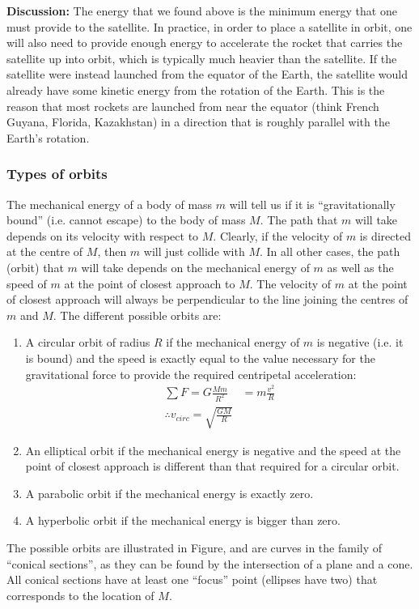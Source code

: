 \begin{example}
\textbf{Discussion:} The energy that we found above is the minimum energy that one must provide to the satellite. In practice, in order to place a satellite in orbit, one will also need to provide enough energy to accelerate the rocket that carries the satellite up into orbit, which is typically much heavier than the satellite. If the satellite were instead launched from the equator of the Earth, the satellite would already have some kinetic energy from the rotation of the Earth. This is the reason that most rockets are launched from near the equator (think French Guyana, Florida, Kazakhstan) in a direction that is roughly parallel with the Earth's rotation.
\end{example}

\subsubsection{Types of orbits}
The mechanical energy of a body of mass $m$ will tell us if it is ``gravitationally bound'' (i.e. cannot escape) to the body of mass $M$. The path that $m$ will take depends on its velocity with respect to $M$. Clearly, if the velocity of $m$ is directed at the centre of $M$, then $m$ will just collide with $M$. In all other cases, the path (orbit) that $m$ will take depends on the mechanical energy of $m$ as well as the speed of $m$ at the point of closest approach to $M$. The velocity of $m$ at the point of closest approach will always be perpendicular to the line joining the centres of $m$ and $M$. The different possible orbits are:
\begin{enumerate}
\item A circular orbit of radius $R$ if the mechanical energy of $m$ is negative (i.e. it is bound) and the speed is exactly equal to the value necessary for the gravitational force to provide the required centripetal acceleration:
\begin{align*}
\sum F = G\frac{Mm}{R^2} &= m\frac{v^2}{R}\\
\therefore v_{circ}=\sqrt{\frac{GM}{R}}
\end{align*}
\item An elliptical orbit if the mechanical energy is negative and the speed at the point of closest approach is different than that required for a circular orbit.
\item A parabolic orbit if the mechanical energy is exactly zero.
\item A hyperbolic orbit if the mechanical energy is bigger than zero.
\end{enumerate}
The possible orbits are illustrated in Figure, and are curves in the family of ``conical sections'', as they can be found by the intersection of a plane and a cone. All conical sections have at least one ``focus'' point (ellipses have two) that corresponds to the location of $M$. 

